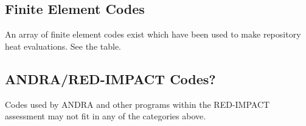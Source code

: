 \subsection{Finite Element Codes}

An array of finite element codes exist which have been used to make 
repository heat evaluations. See the table. 

\subsection{ANDRA/RED-IMPACT Codes?}

Codes used by ANDRA and other programs within the RED-IMPACT assessment may not  
fit in any of the categories above.



















